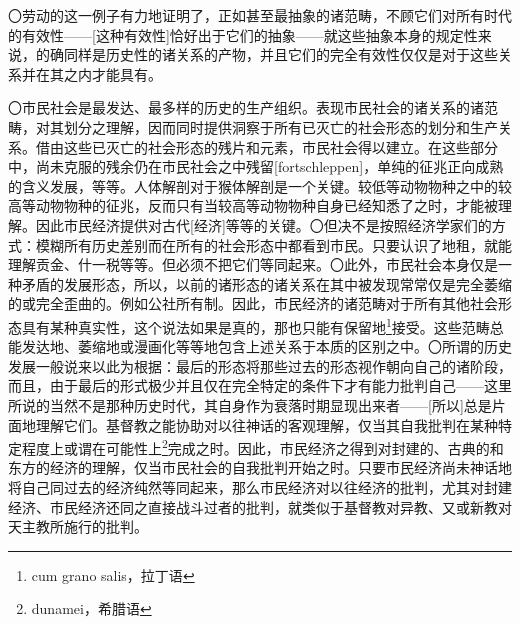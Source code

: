 \documentclass[a5paper,twoside,10.5pt]{ctexart}
\begin{document}
〇劳动的这一例子有力地证明了，正如甚至最抽象的诸范畴，不顾它们对所有时代的有效性——[这种有效性]恰好出于它们的抽象——就这些抽象本身的规定性来说，的确同样是历史性的诸关系的产物，并且它们的完全有效性仅仅是对于这些关系并在其之内才能具有。

〇市民社会是最发达、最多样的历史的生产组织。表现市民社会的诸关系的诸范畴，对其划分之理解，因而同时提供洞察于所有已灭亡的社会形态的划分和生产关系。借由这些已灭亡的社会形态的残片和元素，市民社会得以建立。在这些部分中，尚未克服的残余仍在市民社会之中残留[fortschleppen]，单纯的征兆正向成熟的含义发展，等等。人体解剖对于猴体解剖是一个关键。较低等动物物种之中的较高等动物物种的征兆，反而只有当较高等动物物种自身已经知悉了之时，才能被理解。因此市民经济提供对古代[经济]等等的关键。〇但决不是按照经济学家们的方式：模糊所有历史差别而在所有的社会形态中都看到市民。只要认识了地租，就能理解贡金、什一税等等。但必须不把它们等同起来。〇此外，市民社会本身仅是一种矛盾的发展形态，所以，以前的诸形态的诸关系在其中被发现常常仅是完全萎缩的或完全歪曲的。例如公社所有制。因此，市民经济的诸范畴对于所有其他社会形态具有某种真实性，这个说法如果是真的，那也只能有保留地\footnote{cum grano salis，拉丁语}接受。这些范畴总能发达地、萎缩地或漫画化等等地包含上述关系于本质的区别之中。〇所谓的历史发展一般说来以此为根据：最后的形态将那些过去的形态视作朝向自己的诸阶段，而且，由于最后的形式极少并且仅在完全特定的条件下才有能力批判自己——这里所说的当然不是那种历史时代，其自身作为衰落时期显现出来者——[所以]总是片面地理解它们。基督教之能协助对以往神话的客观理解，仅当其自我批判在某种特定程度上或谓在可能性上\footnote{dunamei，希腊语}完成之时。因此，市民经济之得到对封建的、古典的和东方的经济的理解，仅当市民社会的自我批判开始之时。只要市民经济尚未神话地将自己同过去的经济纯然等同起来，那么市民经济对以往经济的批判，尤其对封建经济、市民经济还同之直接战斗过者的批判，就类似于基督教对异教、又或新教对天主教所施行的批判。
\end{document}
